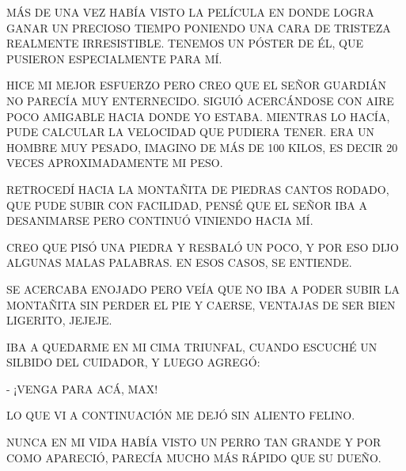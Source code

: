 MÁS DE UNA VEZ HABÍA VISTO LA PELÍCULA EN DONDE LOGRA GANAR UN PRECIOSO TIEMPO PONIENDO UNA CARA DE TRISTEZA REALMENTE IRRESISTIBLE. TENEMOS UN PÓSTER DE ÉL, QUE PUSIERON ESPECIALMENTE PARA MÍ.

HICE MI MEJOR ESFUERZO PERO CREO QUE EL SEÑOR GUARDIÁN NO PARECÍA MUY ENTERNECIDO. SIGUIÓ ACERCÁNDOSE CON AIRE POCO AMIGABLE HACIA DONDE YO ESTABA. MIENTRAS LO HACÍA, PUDE CALCULAR LA VELOCIDAD QUE PUDIERA TENER. ERA UN HOMBRE MUY PESADO, IMAGINO DE MÁS DE 100 KILOS, ES DECIR 20 VECES APROXIMADAMENTE MI PESO.




\newpage
{}
RETROCEDÍ HACIA LA MONTAÑITA DE PIEDRAS CANTOS RODADO, QUE PUDE SUBIR CON FACILIDAD, PENSÉ QUE EL SEÑOR IBA A DESANIMARSE PERO CONTINUÓ VINIENDO HACIA MÍ. 

CREO QUE PISÓ UNA PIEDRA Y RESBALÓ UN POCO, Y POR ESO DIJO ALGUNAS MALAS PALABRAS. EN ESOS CASOS, SE ENTIENDE.

SE ACERCABA ENOJADO PERO VEÍA QUE NO IBA A PODER SUBIR LA MONTAÑITA SIN PERDER EL PIE Y CAERSE, VENTAJAS DE SER BIEN LIGERITO, JEJEJE.

IBA A QUEDARME EN MI CIMA TRIUNFAL, CUANDO ESCUCHÉ UN SILBIDO DEL CUIDADOR, Y LUEGO AGREGÓ:

- ¡VENGA PARA ACÁ, MAX!

LO QUE VI A CONTINUACIÓN ME DEJÓ SIN ALIENTO FELINO.



\newpage
{}


\newpage
{}
NUNCA EN MI VIDA HABÍA VISTO UN PERRO TAN GRANDE  Y POR COMO APARECIÓ, PARECÍA MUCHO MÁS RÁPIDO QUE SU DUEÑO. 

